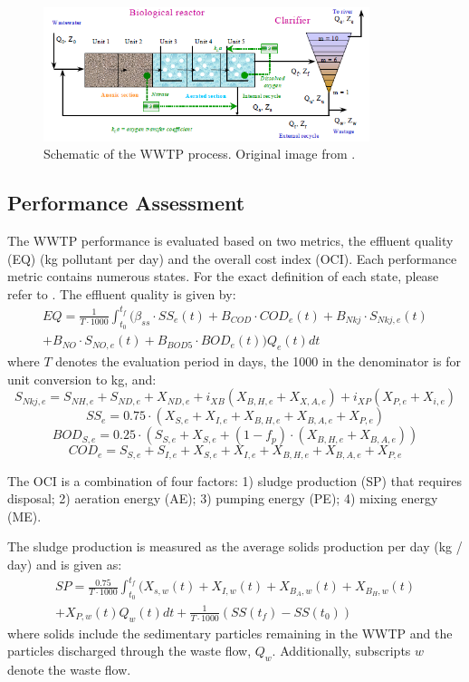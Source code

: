 \begin{figure}[H]
    \centering
    \includegraphics[width=0.85\textwidth]{images/ch3/WWTP.png}
    \caption{Schematic of the WWTP process. Original image from \cite{wwtp}.}
    \label{fig:04WWTP}
\end{figure}

\subsection{Performance Assessment}
The WWTP performance is evaluated based on two metrics, the effluent quality (EQ) (kg pollutant per day) and the overall cost index (OCI). Each performance metric contains numerous states.  For the exact definition of each state, please refer to \cite{wwtp}.  The effluent quality is given by:
\begin{multline}
    EQ = \frac{1}{T \cdot 1000} \int^{t_f}_{t_0} ( \beta_{ss} \cdot SS_e(t) + B_{COD} \cdot COD_e(t) + B_{Nkj} \cdot S_{Nkj, e}(t) \\ 
    + B_{NO} \cdot S_{NO, e}(t) + B_{BOD5} \cdot BOD_e(t)) Q_e(t) dt
\end{multline}
where $T$ denotes the evaluation period in days, the 1000 in the denominator is for unit conversion to kg, and:
$$S_{Nkj, e} = S_{NH, e} + S_{ND, e} + X_{ND, e} + i_{XB}(X_{B, H, e} + X_{X, A, e}) + i_{XP} (X_{P, e} + X_{i, e})$$
$$SS_e = 0.75 \cdot (X_{S, e} + X_{I, e} + X_{B, H, e} + X_{B, A, e} + X_{P, e})$$
$$BOD_{S, e} = 0.25 \cdot (S_{S, e} + X_{S, e} + (1 - f_p) \cdot (X_{B, H, e} + X_{B, A, e}))$$
$$COD_e = S_{S, e} + S_{I, e} + X_{S, e} + X_{I, e} + X_{B, H, e} + X_{B, A, e} + X_{P, e}$$

The OCI is a combination of four factors: 1) sludge production (SP) that requires disposal; 2) aeration energy (AE); 3) pumping energy (PE);  4) mixing energy (ME). 

The sludge production is measured as the average solids production per day (kg / day) and is given as:
\begin{multline}
    SP = \frac{0.75}{T \cdot 1000} \int_{t_0}^{t_f} (X_{s, w}(t) + X_{I, w}(t) + X_{B_A, w}(t) + X_{B_H, w}(t) \\ 
    + X_{P, w}(t) Q_w(t)dt + \frac{1}{T \cdot 1000} (SS(t_f) - SS(t_0))
\end{multline}
where solids include the sedimentary particles remaining in the WWTP and the particles discharged through the waste flow, $Q_w$. Additionally, subscripts $w$ denote the waste flow.

